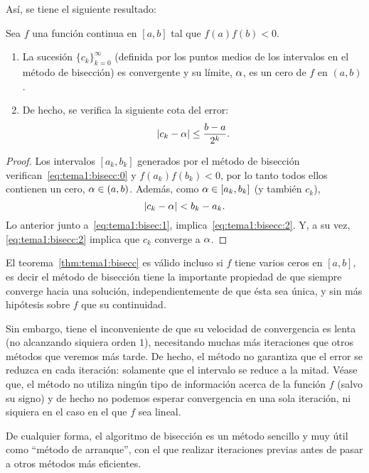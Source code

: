 Así, se tiene el siguiente resultado:
\begin{theorem}
  \label{thm:tema1:bisecc}
  Sea $f$ una función continua en $[a,b]$ tal que $f(a)f(b)<0$.
  \begin{enumerate}
  \item La sucesión $\{c_k\}_{k=0}^\infty$ (definida por los puntos
    medios de los intervalos en el método de bisección) es convergente
    y su límite, $\alpha$, es un cero de $f$ en $(a,b)$.
  \item De hecho, se verifica la siguiente cota del error:
    \begin{equation}
      \label{eq:tema1:bisecc:2}
      |c_k-\alpha| \le \frac{b-a}{2^k}.
    \end{equation}
  \end{enumerate}
\end{theorem}

\begin{proof}
  Los intervalos $[a_k,b_k]$ generados por el método de bisección
  verifican~\eqref{eq:tema1:bisecc:0} y $f(a_k)f(b_k)<0$, por lo tanto
  todos ellos contienen un cero, $\alpha\in (a,b)$. Además, como
  $\alpha\in [a_k,b_k]$ (y también $c_k$),
  $$
  |c_k - \alpha| < b_k - a_k.
  $$
  Lo anterior junto a~\eqref{eq:tema1:bisec:1},
  implica~\eqref{eq:tema1:bisecc:2}. Y, a su vez,
  \eqref{eq:tema1:bisecc:2} implica que $c_k$ converge a $\alpha$.
\end{proof}

\begin{remark}
  \label{rk:tema1:unicidad-bisecc}
  El teorema~\ref{thm:tema1:bisecc} es válido incluso si $f$ tiene
  varios ceros en $[a,b]$, es decir el método de bisección tiene la
  importante propiedad de que siempre converge hacia una solución,
  independientemente de que ésta sea única, y sin más hipótesis sobre
  $f$ que su continuidad.

Sin embargo, tiene el inconveniente de que su velocidad de
convergencia es lenta (no alcanzando siquiera orden $1$), necesitando
muchas más iteraciones que otros métodos que veremos más tarde. De
hecho, el método no garantiza que el error se reduzca en cada
iteración: solamente que el intervalo se reduce a la mitad. Véase que,
el método no utiliza ningún tipo de información acerca de la función
$f$ (salvo su signo) y de hecho no podemos esperar convergencia en una
sola iteración, ni siquiera en el caso en el que $f$ sea lineal.

De cualquier forma, el algoritmo de bisección es un método sencillo y
muy útil como ``método de arranque'', con el que realizar iteraciones
previas antes de pasar a otros métodos más eficientes.
 \end{remark}

